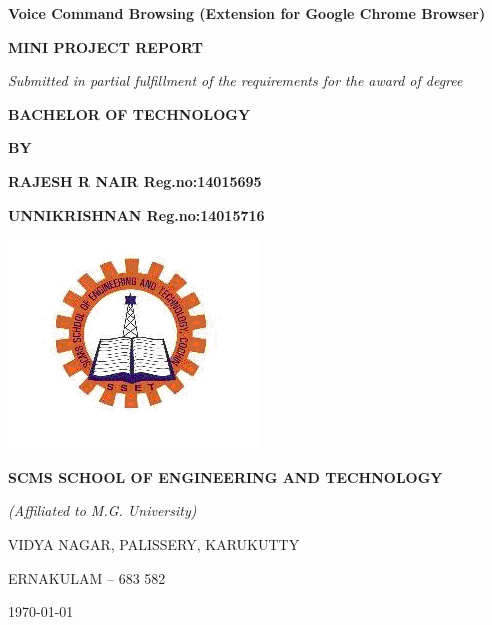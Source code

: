 \documentclass[12pt]{report} %
\begin{document}
	
	\thispagestyle{empty}
	\begin{center}
		\begin{minipage}{\linewidth}
			\centering
			\vspace{0.5cm}
			{\Huge \bf{Voice Command Browsing (Extension for Google Chrome  Browser)}\par}
			\vspace{0.5cm}
			{\Large \bfseries{MINI PROJECT REPORT}\par}
			\vspace{0.25cm}
			{\Large \emph{Submitted in partial fulfillment of the requirements for the award of degree}\par}
			\vspace{0.25cm}
			{\Large \bf{BACHELOR OF TECHNOLOGY} \par}
			\vspace{0.25cm}
			{\Large \bf{BY} \par}
			\vspace{0.5cm}
			{\Large \bf{RAJESH R NAIR}\hspace{3cm}     Reg.no:14015695 \par}
			{\Large \bf{UNNIKRISHNAN}\hspace{3cm}      Reg.no:14015716 \par}
			\vspace{1cm}
			\includegraphics[width=0.5\linewidth]{figures/logo.png}
			
			{\Large \bfseries{SCMS SCHOOL OF ENGINEERING AND TECHNOLOGY}\par}
			{\Large \emph{(Affiliated to M.G. University)}\par}
			{\Large VIDYA NAGAR, PALISSERY, KARUKUTTY\par}
			{\Large ERNAKULAM – 683 582\par}
			\vspace{1cm}
			
			
			{\Large \monthyeardate \today}
		\end{minipage}
	\end{center}
	\clearpage
	
\end{document}
